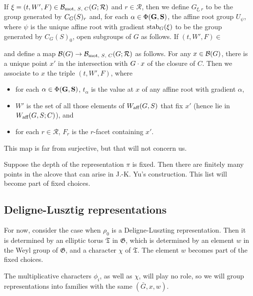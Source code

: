 \documentclass[12pt]{amsart}
\newcommand{\bG}{\mathbf{G}}
\newcommand{\fG}{\mathfrak G}
\newcommand{\fT}{\mathfrak T}
\theoremstyle{plain}
\theoremstyle{definition}
\begin{document}
If \(\xi = (t, W', F) \in \motBpin(G; \mathcal R)\)
and \(r \in \mathcal R\), then we define
\(G_{\xi, r}\) to be the group generated by \(\Cent_G(S)_r\)
and, for each \(\alpha \in \Phi(\bG, \bS)\), the affine root
group \(U_\psi\), where \(\psi\) is the unique affine root
with gradient
\(\stab_G(\xi)\) to be the group generated by \(C_G(S)_0\), 
open subgroups of \(G\) as follows.
If \((t, W', F) \in \)

and define a map \(\BB(G) \to \motBpin(G; \mathcal R)\) as follows.
For any \(x \in \BB(G)\), there is a unique point \(x'\) in the
intersection with \(G\dota x\) of the closure of \(C\).
	\citeme
Then we associate to \(x\) the triple \((t, W', F)\), where
	\begin{itemize}
	\item for each \(\alpha \in \Phi(\bG, \bS)\),
\(t_\alpha\) is the value at \(x\) of any affine root with
gradient \(\alpha\),
		\citeme
	\item \(W'\) is the set of all those elements of
\(\affW(G, S)\) that fix \(x'\) (hence lie in \(\affW(G, S; C)\)),
and	\item for each \(r \in \mathcal R\), \(F_r\) is the
\(r\)-facet containing \(x'\).
	\end{itemize}
This map is far from surjective, but that will not concern
us.

Suppose the depth of the representation $\pi$ is fixed. Then there are finitely many points in the alcove that can arise in J.-K. Yu's construction. This list will become part of fixed choices. 

\subsection{Deligne-Lusztig representations} 
For now, consider the case when $\rho_0$ is a Deligne-Luszting representation. 
Then it is determined by an elliptic torus $\fT$ in $\fG$, which is determined by an element $w$ in the Weyl group of $\fG$, and a character $\chi$ of $\fT$.  
The element $w$ becomes  part of the fixed choices.
  
The multiplicative characters $\phi_i$, as well as $\chi$, will play no role, so we will group 
representations into families with the same $(\bar G, x, w)$. 
\end{document}
